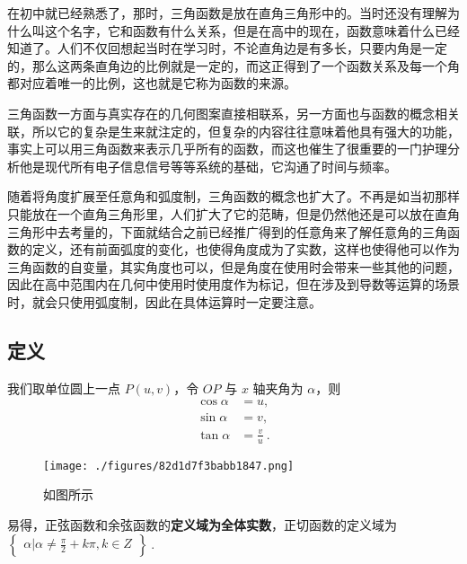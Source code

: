 \begin{issues}
\issueDraft
\end{issues}

在初中就已经熟悉了，那时，三角函数是放在直角三角形中的。当时还没有理解为什么叫这个名字，它和函数有什么关系，但是在高中的现在，函数意味着什么已经知道了。人们不仅回想起当时在学习时，不论直角边是有多长，只要内角是一定的，那么这两条直角边的比例就是一定的，而这正得到了一个函数关系及每一个角都对应着唯一的比例，这也就是它称为函数的来源。

三角函数一方面与真实存在的几何图案直接相联系，另一方面也与函数的概念相关联，所以它的复杂是生来就注定的，但复杂的内容往往意味着他具有强大的功能，事实上可以用三角函数来表示几乎所有的函数，而这也催生了很重要的一门护理分析他是现代所有电子信息信号等等系统的基础，它沟通了时间与频率。

随着将角度扩展至任意角和弧度制，三角函数的概念也扩大了。不再是如当初那样只能放在一个直角三角形里，人们扩大了它的范畴，但是仍然他还是可以放在直角三角形中去考量的，下面就结合之前已经推广得到的任意角来了解任意角的三角函数的定义，还有前面弧度的变化，也使得角度成为了实数，这样也使得他可以作为三角函数的自变量，其实角度也可以，但是角度在使用时会带来一些其他的问题，因此在高中范围内在几何中使用时使用度作为标记，但在涉及到导数等运算的场景时，就会只使用弧度制，因此在具体运算时一定要注意。

\subsection{定义}
我们取单位圆上一点 $P(u,v)$，令 $OP$ 与 $x$ 轴夹角为 $\alpha$，则 
\begin{equation}
\begin{aligned}
\cos\alpha &= u,\\
\sin\alpha &= v,\\
\tan\alpha &= \frac{v}{u}~.
\end{aligned}
\end{equation}
\begin{figure}[ht]
\centering
\texttt{[image: ./figures/82d1d7f3babb1847.png]}
\caption{如图所示} \label{fig_HsTrFu_3}
\end{figure}
易得，正弦函数和余弦函数的\textbf{定义域为全体实数}，正切函数的定义域为 $\begin{Bmatrix}\alpha|\alpha \neq \frac{\pi}{2}+k\pi,k\in Z\end{Bmatrix}~.$

